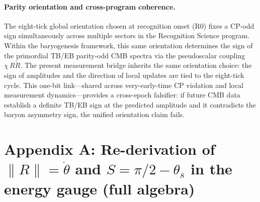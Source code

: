 \documentclass[11pt,letterpaper]{article}
\theoremstyle{definition}
\begin{document}
\paragraph{Parity orientation and cross-program coherence.}
The eight-tick global orientation chosen at recognition onset (R0) fixes a CP-odd sign simultaneously across multiple sectors in the Recognition Science program. Within the baryogenesis framework, this same orientation determines the sign of the primordial TB/EB parity-odd CMB spectra via the pseudoscalar coupling $\chi\,R\tilde R$. The present measurement bridge inherits the same orientation choice: the sign of amplitudes and the direction of local updates are tied to the eight-tick cycle. This one-bit link—shared across very-early-time CP violation and local measurement dynamics—provides a cross-epoch falsifier: if future CMB data establish a definite TB/EB sign at the predicted amplitude and it contradicts the baryon asymmetry sign, the unified orientation claim fails.

\appendix

\section*{Appendix A: Re-derivation of \texorpdfstring{$\|R\|=\dot\theta$}{||R||=θdot} and \texorpdfstring{$S=\pi/2-\theta_s$}{S=π/2−θs} in the energy gauge (full algebra)}
\end{document}
